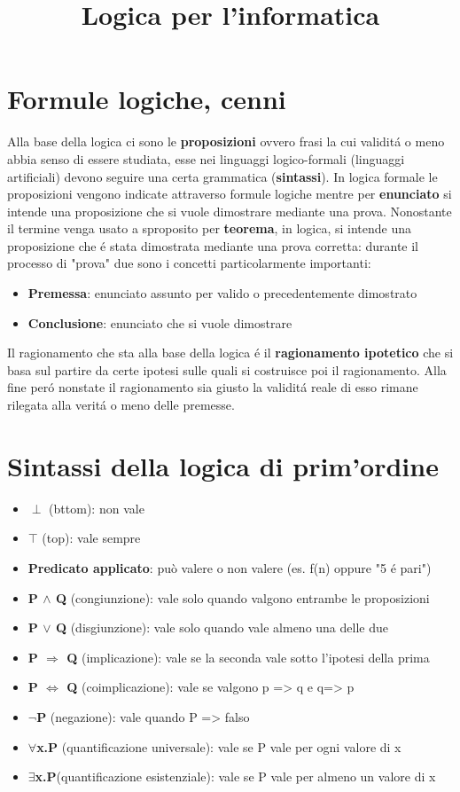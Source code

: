 \documentclass{article}
\title{Logica per l'informatica}
\author{}
\date{}
\begin{document}
\maketitle

\section{Formule logiche, cenni}
Alla base della logica ci sono le \textbf{proposizioni} ovvero frasi la cui validitá o meno abbia senso di essere studiata, esse nei linguaggi logico-formali (linguaggi artificiali) devono seguire una certa grammatica (\textbf{sintassi}). 
In logica formale le proposizioni vengono indicate attraverso formule logiche mentre per \textbf{enunciato} si intende una proposizione che si vuole dimostrare mediante una prova. Nonostante il termine venga usato a sproposito per \textbf{teorema}, in logica, si intende una proposizione che é stata dimostrata mediante una prova corretta: durante il processo di "prova" due sono i concetti particolarmente importanti:
\begin{itemize}
    \item \textbf{Premessa}: enunciato assunto per valido o precedentemente dimostrato
    \item \textbf{Conclusione}: enunciato che si vuole dimostrare
\end{itemize}
Il ragionamento che sta alla base della logica é il \textbf{ragionamento ipotetico} che si basa sul partire da certe ipotesi sulle quali si costruisce poi il ragionamento. Alla fine peró nonstate il ragionamento sia giusto la validitá reale di esso rimane rilegata alla veritá o meno delle premesse.


\section{Sintassi della logica di prim'ordine}
\begin{itemize}
    \item \textbf{$\perp$} (bttom): non vale
    \item \textbf{$\top$} (top): vale sempre
    \item \textbf{Predicato applicato}: può valere o non valere (es. f(n) oppure "5 é pari")
    \item \textbf{P $\land$ Q} (congiunzione): vale solo quando valgono entrambe le proposizioni
    \item \textbf{P $\lor$ Q} (disgiunzione): vale solo quando vale almeno una delle due

    \item \textbf{P $\Rightarrow$ Q} (implicazione): vale se la seconda vale sotto l'ipotesi della prima
    \item \textbf{P $\Leftrightarrow$ Q} (coimplicazione): vale se valgono p => q e q=> p
    \item \textbf{$\neg$P} (negazione): vale quando P => falso
    \item \textbf{$\forall$x.P} (quantificazione universale): vale se P vale per ogni valore di x
    \item \textbf{$\exists$x.P}(quantificazione esistenziale): vale se P vale per almeno un valore di x 
\end{itemize}
\end{document}
